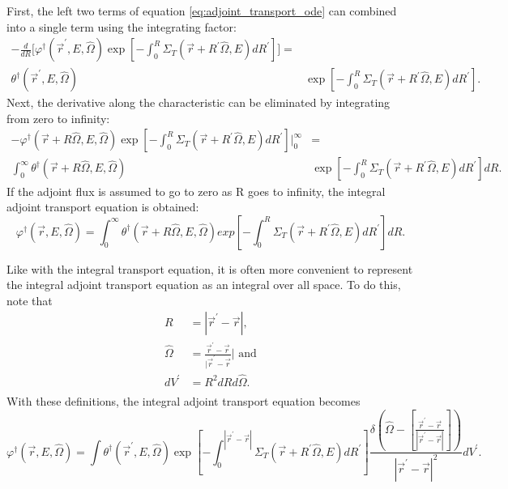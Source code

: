 First, the left two terms of equation \ref{eq:adjoint_transport_ode} can
combined into a single term using the integrating factor:
\begin{align}
  -\frac{d}{dR}\bigg[\varphi^{\dagger}(\vec{r}^{'},E,\hat{\Omega})
    \exp{\left[-\int_0^R \Sigma_T(\vec{r}+R^{'}\hat{\Omega},E)dR^{'}\right]}
    \bigg] = \nonumber \\
  \theta^{\dagger}(\vec{r}^{'},E,\hat{\Omega})
  &\exp{\left[-\int_0^R \Sigma_T(\vec{r}+R^{'}\hat{\Omega},E)dR^{'} \right]}.
  \nonumber
\end{align}
Next, the derivative along the characteristic can be eliminated by integrating
from zero to infinity:
\begin{align}
  -\varphi^{\dagger}(\vec{r} + R\hat{\Omega},E,\hat{\Omega})
  \exp{\left[-\int_0^R \Sigma_T(\vec{r}+R^{'}\hat{\Omega},E)dR^{'}\right]}
  \bigg|_0^{\infty} & = \nonumber \\
  \int_0^{\infty} 
  \theta^{\dagger}(\vec{r} + R\hat{\Omega},E,\hat{\Omega})
  &\exp{\left[-\int_0^R \Sigma_T(\vec{r}+R^{'}\hat{\Omega},E)dR^{'} \right]} dR.
  \nonumber 
\end{align}
If the adjoint flux is assumed to go to zero as R goes to infinity, the integral
adjoint transport equation is obtained:
\begin{equation}
  \varphi^{\dagger}(\vec{r},E,\hat{\Omega}) = 
  \int_0^{\infty} \theta^{\dagger}(\vec{r} + R\hat{\Omega},E,\hat{\Omega})
  exp\left[-\int_0^R \Sigma_T(\vec{r}+R^{'}\hat{\Omega},E)dR^{'} \right] dR.
  \label{eq:line_integral_adj_transport_eqn}
\end{equation}

Like with the integral transport equation, it is often more convenient to 
represent the integral adjoint transport equation as an integral over all space.
To do this, note that
\begin{align}
  R & = |\vec{r}^{'} - \vec{r}|, \nonumber \\
  \hat{\Omega} & = \frac{\vec{r}^{'} - \vec{r}}{|\vec{r}^{'} - \vec{r}}| 
  \text{ and} \nonumber \\
  dV^{'} & = R^2dRd\hat{\Omega}. \nonumber \\
\end{align}
With these definitions, the integral adjoint transport equation becomes
\begin{equation*}
    \varphi^{\dagger}(\vec{r},E,\hat{\Omega}) = 
    \int \theta^{\dagger}(\vec{r}^{'},E,\hat{\Omega})
    \exp{\left[-\int_0^{|\vec{r}^{'} - \vec{r}|} 
      \Sigma_T(\vec{r}+R^{'}\hat{\Omega},E)dR^{'} \right]}
    \frac{\delta \left(\hat{\Omega} - \left[\frac{\vec{r}^{'} - \vec{r}}
        {|\vec{r}^{'} - \vec{r}|}\right]\right)}
    {|\vec{r}^{'} - \vec{r}|^2} dV^{'}.
\end{equation*}

